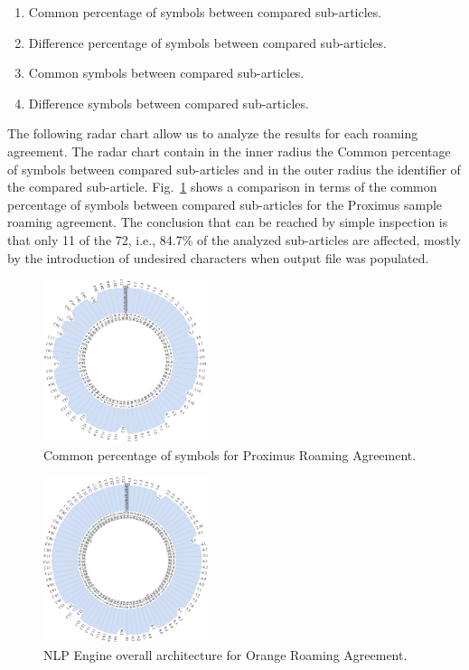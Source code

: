 \documentclass[conference]{style/IEEEtran}
\begin{document}
\begin{enumerate}
\item Common percentage of symbols between compared sub-articles.
\item Difference percentage of symbols between compared sub-articles.
\item Common symbols between compared sub-articles.
\item Difference symbols between compared sub-articles.
\end{enumerate}

The following radar chart allow us to analyze the results for each roaming agreement. The radar chart contain in the inner radius the Common percentage of symbols between compared sub-articles and in the outer radius the identifier of the compared sub-article. Fig.~\ref{fig3} shows a comparison in terms of the common percentage of symbols between compared sub-articles for the Proximus sample roaming agreement. The conclusion that can be reached by simple inspection is that only 11 of the 72, i.e.,  84.7\% of the analyzed sub-articles are affected, mostly by the introduction of undesired characters when output file was populated.

\begin{figure}[htbp]
\centerline{\includegraphics[width=0.43\textwidth]{images/Proximus.png}}
\caption{Common percentage of symbols for Proximus Roaming Agreement.}
\label{fig3}
\end{figure}

\begin{figure}[htbp]
\centerline{\includegraphics[width=0.43\textwidth]{images/Orange.png}}
\caption{NLP Engine overall architecture for Orange Roaming Agreement.}
\label{fig4}
\end{figure}
\end{document}
